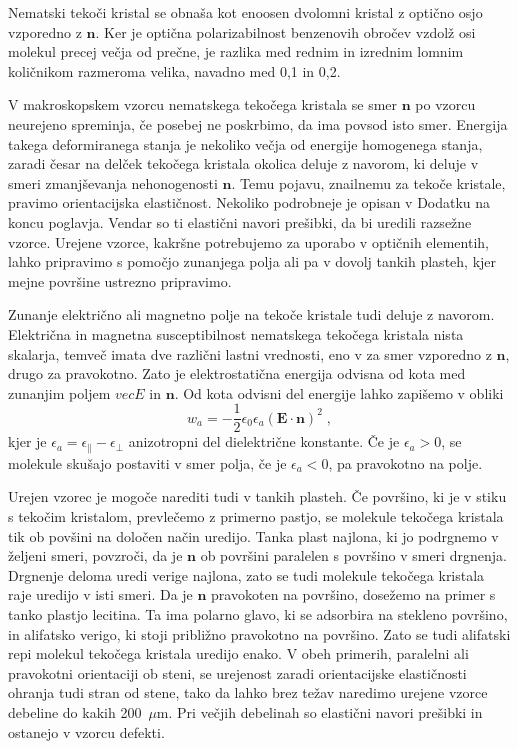 Nematski tekoči kristal se obnaša kot enoosen dvolomni kristal z optično
osjo vzporedno z $\mathbf{n}$. Ker je optična polarizabilnost benzenovih
obročev vzdolž osi molekul precej večja od prečne, je razlika med
rednim in izrednim lomnim količnikom razmeroma velika, navadno med
0,1 in 0,2.

V makroskopskem vzorcu nematskega tekočega kristala se smer $\mathbf{n}$
po vzorcu neurejeno spreminja, če posebej ne poskrbimo, da ima povsod
isto smer. Energija takega deformiranega stanja je nekoliko večja
od energije homogenega stanja, zaradi česar na delček tekočega kristala
okolica deluje z navorom, ki deluje v smeri zmanjševanja nehonogenosti
$\mathbf{n}$. Temu pojavu, zna\textquotedbl{}ilnemu za tekoče kristale,
pravimo orientacijska elastičnost. Nekoliko podrobneje je opisan v
Dodatku na koncu poglavja. Vendar so ti elastični navori prešibki,
da bi uredili razsežne vzorce. Urejene vzorce, kakršne potrebujemo
za uporabo v optičnih elementih, lahko pripravimo s pomočjo zunanjega
polja ali pa v dovolj tankih plasteh, kjer mejne površine ustrezno
pripravimo.

Zunanje električno ali magnetno polje na tekoče kristale tudi deluje
z navorom. Električna in magnetna susceptibilnost nematskega tekočega
kristala nista skalarja, temveč imata dve različni lastni vrednosti,
eno v za smer vzporedno z $\mathbf{n}$, drugo za pravokotno. Zato je
elektrostatična energija odvisna od kota med zunanjim poljem $vec{E}$
in $\mathbf{n}$. Od kota odvisni del energije lahko zapišemo v obliki
\begin{equation}
w_{a}=-\frac{1}{2}\epsilon_{0}\epsilon_{a}(\mathbf{E}\cdot\mathbf{n})^{2}\;,\label{7.56}
\end{equation}
 kjer je $\epsilon_{a}=\epsilon_{\parallel}-\epsilon_{\perp}$ anizotropni
del dielektrične konstante. Če je $\epsilon_{a}>0$, se molekule skušajo
postaviti v smer polja, če je $\epsilon_{a}<0$, pa pravokotno na
polje.

Urejen vzorec je mogoče narediti tudi v tankih plasteh. Če površino,
ki je v stiku s tekočim kristalom, prevlečemo z primerno pastjo, se
molekule tekočega kristala tik ob povšini na določen način uredijo.
Tanka plast najlona, ki jo podrgnemo v željeni smeri, povzroči, da
je $\mathbf{n}$ ob površini paralelen s površino v smeri drgnenja. Drgnenje
deloma uredi verige najlona, zato se tudi molekule tekočega kristala
raje uredijo v isti smeri. Da je $\mathbf{n}$ pravokoten na površino,
dosežemo na primer s tanko plastjo lecitina. Ta ima polarno glavo,
ki se adsorbira na stekleno površino, in alifatsko verigo, ki stoji
približno pravokotno na površino. Zato se tudi alifatski repi molekul
tekočega kristala uredijo enako. V obeh primerih, paralelni ali pravokotni
orientaciji ob steni, se urejenost zaradi orientacijske elastičnosti
ohranja tudi stran od stene, tako da lahko brez težav naredimo urejene
vzorce debeline do kakih 200~$\mu$m. Pri večjih debelinah so elastični
navori prešibki in ostanejo v vzorcu defekti.


